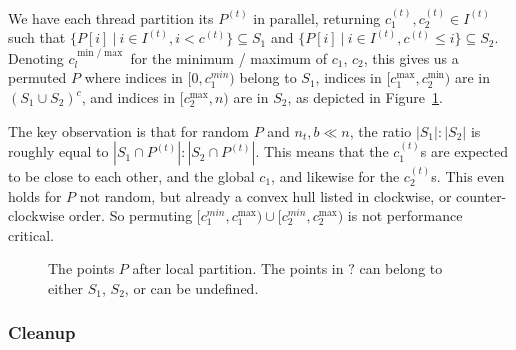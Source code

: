 We have each thread partition its $P^{(t)}$ in parallel, returning 
$c_{1}^{(t)}, c_{2}^{(t)} \in I^{(t)}$ such that
$\{P[i] \ | \ i \in I^{(t)}, i < c^{(t)}\} \subseteq S_1$
and $\{P[i] \ | \ i \in I^{(t)}, c^{(t)} \leq i\} \subseteq S_2$.
Denoting $c_{l}^{\min / \max}$ for the minimum / maximum of $c_1$, $c_2$, this
gives us a permuted $P$ where indices in $[0, c_1^{min})$ belong to $S_1$,
indices in $[c_{1}^{\max}, c_2^{\min})$ are in $(S_1 \cup S_2)^c$, and
indices in $[c_2^{\max}, n)$ are in $S_2$, as depicted in 
Figure~\ref{fig:local_part}.

The key observation is that for random $P$ and $n_t, b \ll n$, the ratio 
$|S_1| : |S_2|$ is roughly equal to $|S_1 \cap P^{(t)}| : |S_2 \cap P^{(t)}|$.
This means that the $c_1^{(t)}$s are expected to be close to each other, and
the global $c_1$, and likewise for the $c_2^{(t)}$s. This even holds for $P$
not random, but already a convex hull listed in clockwise, or counter-clockwise
order. So permuting $[c_1^{min}, c_1^{\max}) \cup [c_2^{min}, c_2^{\max})$
is not performance critical.

\begin{figure}[ht]
    \caption{The points $P$ after local partition. The points in $?$ can
             belong to either $S_1$, $S_2$, or can be undefined.}
    \label{fig:local_part}
\end{figure}

\subsubsection{Cleanup}

%


